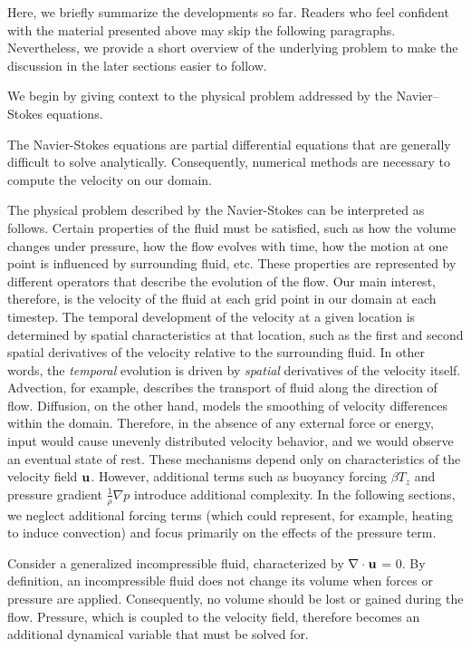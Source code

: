 Here, we briefly summarize the developments so far. Readers who feel
confident with the material presented above may skip the following
paragraphs. Nevertheless, we provide a short overview of the underlying
problem to make the discussion in the later sections easier to follow.

We begin by giving context to the physical problem addressed by the
Navier--Stokes equations.

The Navier-Stokes equations are partial differential equations that are
generally difficult to solve analytically. Consequently, numerical methods
are necessary to compute the velocity on our domain.

The physical problem described by the Navier-Stokes can be interpreted as
follows. Certain properties of the fluid must be satisfied, such as how
the volume changes under pressure, how the flow evolves with time, how the
motion at one point is influenced by surrounding fluid, etc. These 
properties are represented by different operators that describe the 
evolution of the flow.
Our main interest, therefore, is the velocity of the fluid at each grid
point in our domain at each timestep. The temporal development of the 
velocity at a given location is determined by spatial characteristics at
that location, such as the first and second spatial derivatives of the 
velocity relative to the surrounding fluid. In other words, the 
\textit{temporal} evolution is driven by \textit{spatial} derivatives of
the velocity itself. 
Advection, for example, describes the transport of fluid along the 
direction of flow. Diffusion, on the other hand, models the smoothing of
velocity differences within the domain. Therefore, in the absence of any
external force or energy, input would cause unevenly distributed velocity
behavior, and we would observe an eventual state of rest.
These mechanisms depend only on characteristics of the velocity field 
$\textbf u$. However, additional terms such as buoyancy forcing 
$\beta T_z$ and pressure gradient $\frac{1}{\rho}\nabla p$ introduce
additional complexity. In the following sections, we neglect additional
forcing terms (which could represent, for example, heating to induce
convection) and focus primarily on the effects of the pressure term.

Consider a generalized incompressible fluid, characterized by $\nabla 
\cdot \textbf u$ = 0. By definition, an incompressible fluid does not
change its volume when forces or pressure are applied. Consequently, no
volume should be lost or gained during the flow. Pressure, which is
coupled to the velocity field, therefore becomes an additional dynamical
variable that must be solved for.

